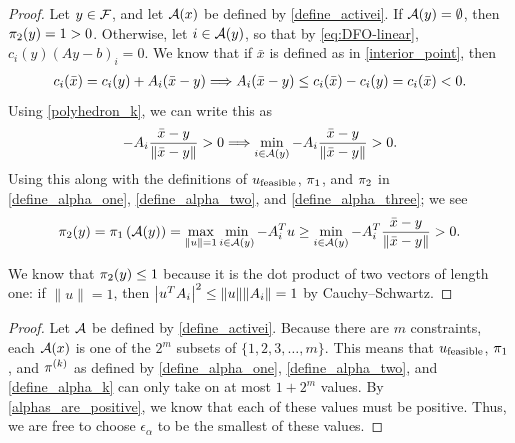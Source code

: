 \begin{proof}

Let $y \in {\mathcal F}$, and let ${\mathcal A}(x)$ be defined by \cref{define_activei}.
If ${\mathcal A}(y) = \emptyset$, then $\pi_2(y) = 1 > 0$.
Otherwise, let $i \in {\mathcal A}(y)$, so that by \cref{eq:DFO-linear}, $c_i(y) (Ay - b)_i= 0$.
We know that if $\bar x$ is defined as in \cref{interior_point}, then
\begin{align*}
c_i(\bar x) = c_i(y) + {{A}}_i(\bar x - y)
\Longrightarrow {{A}}_i(\bar x - y) \le c_i(\bar x) - c_i(y) = c_i(\bar x) < 0.
\end{align*}
Using \cref{polyhedron_k}, we can write this as
\begin{align*}
-{{A}}_i\frac {\bar x - y}{\|\bar x - y\|} > 0  \Longrightarrow \min_{i \in {\mathcal A}(y)} -{{A}}_i\frac {\bar x - y}{\|\bar x - y\|} > 0.
\end{align*}
Using this along with the definitions of ${u_{\textrm{feasible}}}$, ${\pi_1}$, and $\pi_2$ in \cref{define_alpha_one}, \cref{define_alpha_two}, and \cref{define_alpha_three}; we see
\begin{align*}
\pi_2(y) = {\pi_1}\left({\mathcal A}(y)\right) = \max_{\|u\| = 1} \min_{i \in {\mathcal A}(y)} -{{A}}_i^Tu
\ge \min_{i \in {\mathcal A}(y)} - {{A}}_i^T\frac {\bar x - y}{\|\bar x - y\|} > 0.
\end{align*}

We know that $\pi_2(y) \le 1$ because it is the dot product of two vectors of length one:
if $\|u\| = 1$, then $\left|u^T {{A}}_i\right|^2 \le \|u\|\|{{A}}_i\| = 1$ by Cauchy–Schwartz.

\end{proof}

\begin{proof}

Let ${\mathcal A}$ be defined by \cref{define_activei}.
Because there are $m$ constraints, each ${\mathcal A}(x)$ is one of the $2^m$ subsets of  $\{1, 2, 3, \ldots, m\}$.
This means that ${u_{\textrm{feasible}}}$, ${\pi_1}$, and $\pi^{(k)}$ as defined by \cref{define_alpha_one}, \cref{define_alpha_two}, and \cref{define_alpha_k} can only take on at most $1 + 2^m$ values.
By \cref{alphas_are_positive}, we know that each of these values must be positive.
Thus, we are free to choose $\epsilon_{\alpha}$ to be the smallest of these values.
\end{proof}

